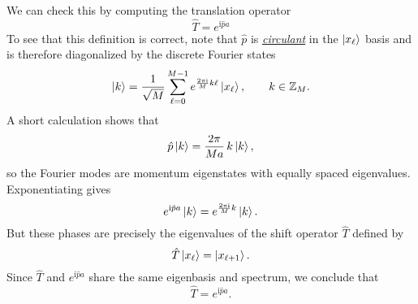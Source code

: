 \documentclass[10pt, a4paper]{article}
\newcommand{\ii}{\mathrm{i}}
\numberwithin{equation}{section}
\begin{document}
We can check this by computing the translation operator
\begin{equation}
  \hat{T} = e^{\ii \hat{p} a}
\end{equation}
To see that this definition is correct, note that $\hat{p}$ is \href{https://en.wikipedia.org/wiki/Circulant_matrix}{{\color{blue} \textit{circulant}}} in the $\ket{x_\ell}$ basis and is therefore diagonalized by the discrete Fourier states
\begin{equation}
  \ket{k} = \frac{1}{\sqrt{M}} \sum_{\ell=0}^{M-1} 
  e^{\frac{2\pi \ii}{M} k \ell} \ket{x_\ell}, 
  \qquad k \in \mathbb{Z}_M .
\end{equation}
A short calculation shows that
\begin{equation}
  \hat{p} \ket{k} = \frac{2\pi}{M a}\, k \ket{k},
\end{equation}
so the Fourier modes are momentum eigenstates with equally spaced eigenvalues.  
Exponentiating gives
\begin{equation}
  e^{\ii \hat{p} a} \ket{k} = e^{\frac{2\pi \ii}{M} k} \ket{k}.
\end{equation}
But these phases are precisely the eigenvalues of the shift operator $\hat{T}$ defined by
\begin{equation}
  \hat{T}\ket{x_\ell} = \ket{x_{\ell+1}}.
\end{equation}
Since $\hat{T}$ and $e^{\ii \hat{p} a}$ share the same eigenbasis and spectrum, we conclude that
\begin{equation}
  \hat{T} = e^{\ii \hat{p} a}.
\end{equation}



\printbibliography
\end{document}
